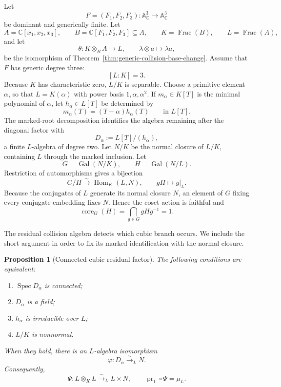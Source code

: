 \documentclass[11pt]{article}
\newtheorem{proposition}[theorem]{Proposition}
\theoremstyle{remark}
\theoremstyle{definition}
\DeclareMathOperator{\Spec}{Spec}
\DeclareMathOperator{\Frac}{Frac}
\DeclareMathOperator{\Gal}{Gal}
\DeclareMathOperator{\Hom}{Hom}
\DeclareMathOperator{\core}{core}
\newcommand{\A}{\mathbb A}
\newcommand{\C}{\mathbb C}
\begin{document}
Let
\[
  F=(F_1,F_2,F_3)\colon\A^3_{\C}\longrightarrow\A^3_{\C}
\]
be dominant and generically finite.  Let
\[
  A=\C[x_1,x_2,x_3],
  \qquad
  B=\C[F_1,F_2,F_3]\subseteq A,
  \qquad
  K=\Frac(B),
  \qquad
  L=\Frac(A),
\]
and let
\[
  \theta\colon K\otimes_BA\longrightarrow L,
  \qquad
  \lambda\otimes a\longmapsto\lambda a,
\]
be the isomorphism of
Theorem~\ref{thm:generic-collision-base-change}.  Assume that \(F\) has
generic degree three:
\[
  [L:K]=3.
\]
Because \(K\) has characteristic zero, \(L/K\) is separable.  Choose a
primitive element \(\alpha\), so that \(L=K(\alpha)\) with power basis
\(1,\alpha,\alpha^2\).
If \(m_\alpha\in K[T]\) is the minimal polynomial of \(\alpha\), let
\(h_\alpha\in L[T]\) be determined by
\[
  m_\alpha(T)=(T-\alpha)h_\alpha(T)
  \qquad\text{in }L[T].
\]
The marked-root decomposition identifies the algebra remaining after the
diagonal factor with
\[
  D_\alpha:=L[T]/(h_\alpha),
\]
a finite \(L\)-algebra of degree two.
Let \(N/K\) be the normal closure of \(L/K\), containing \(L\) through
the marked inclusion.  Let
\[
  G=\Gal(N/K),
  \qquad
  H=\Gal(N/L).
\]
Restriction of automorphisms gives a bijection
\[
  G/H\xrightarrow{\sim}\Hom_K(L,N),
  \qquad gH\longmapsto g|_L.
\]
Because the conjugates of \(L\) generate its normal closure \(N\), an
element of \(G\) fixing every conjugate embedding fixes \(N\).  Hence the
coset action is faithful and
\[
  \core_G(H)=\bigcap_{g\in G}gHg^{-1}=1.
\]

The residual collision algebra detects which cubic branch occurs.  We
include the short argument in order to fix its marked identification with
the normal closure.

\begin{proposition}[Connected cubic residual factor]
\label{prop:cubic-tensor-decomposition}
The following conditions are equivalent:
\begin{enumerate}[label=\textup{(\roman*)}]
  \item \(\Spec D_\alpha\) is connected;
  \item \(D_\alpha\) is a field;
  \item \(h_\alpha\) is irreducible over \(L\);
  \item \(L/K\) is nonnormal.
\end{enumerate}
When they hold, there is an \(L\)-algebra isomorphism
\[
  \varphi\colon D_\alpha\xrightarrow{\sim}_L N.
\]
Consequently,
\[
  \Psi\colon L\otimes_KL\xrightarrow{\sim}_L L\times N,
  \qquad
  \operatorname{pr}_1\circ\Psi=\mu_L.
\]
\end{proposition}
\end{document}
